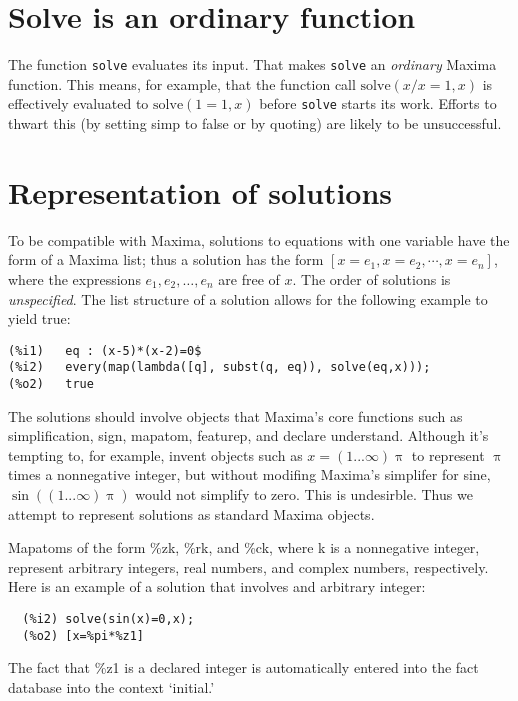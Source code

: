 \documentclass[]{scrartcl}
\newcommand{\solve}{\texttt{solve}}
\begin{document}
\section{Solve is an ordinary function}

The function \solve \/ evaluates its input. That makes \solve \/ an \emph{ordinary} Maxima function. This means, for example, that the function call \(\mathrm{solve}(x/x=1,x)\) is effectively evaluated to
\(\mathrm{solve}(1=1,x)\) before \solve \/ starts its work. Efforts to thwart this (by setting simp to false or by quoting) are likely to be unsuccessful.

\section{Representation of solutions}

To be compatible with Maxima, solutions to equations with one variable have the form of a Maxima list; thus a solution has the form \([x = e_1, x = e_2, \cdots, x = e_n]\), where the expressions \(e_1, e_2, \dots, e_n\) are free of \(x\). The order of solutions is \emph{unspecified}. The list structure of a solution allows for the following example to yield true:

\begin{verbatim}
(%i1)	eq : (x-5)*(x-2)=0$
(%i2)	every(map(lambda([q], subst(q, eq)), solve(eq,x)));
(%o2)	true
\end{verbatim}

The solutions should involve objects that Maxima's core functions such as simplification, sign, mapatom, featurep, and declare understand. Although it's tempting to, for example, invent objects such as
\(x = (1 ... \infty) \uppi\) to represent \(\uppi\) times a nonnegative integer, but without modifing
Maxima's simplifer for sine, \(\sin \left ((1 ... \infty) \uppi \right) \) would not simplify
 to zero. This is undesirble. Thus we attempt to represent solutions as standard Maxima objects.

Mapatoms of the form \%zk, \%rk, and \%ck, where k is a nonnegative integer, represent arbitrary integers, real numbers, and complex numbers, respectively. Here is an example of a solution that involves and arbitrary integer:
\begin{verbatim}
  (%i2)	solve(sin(x)=0,x);
  (%o2)	[x=%pi*%z1]
\end{verbatim}
The fact that \%z1 is a declared integer is automatically entered into the fact database into the context `initial.'
\end{document}
